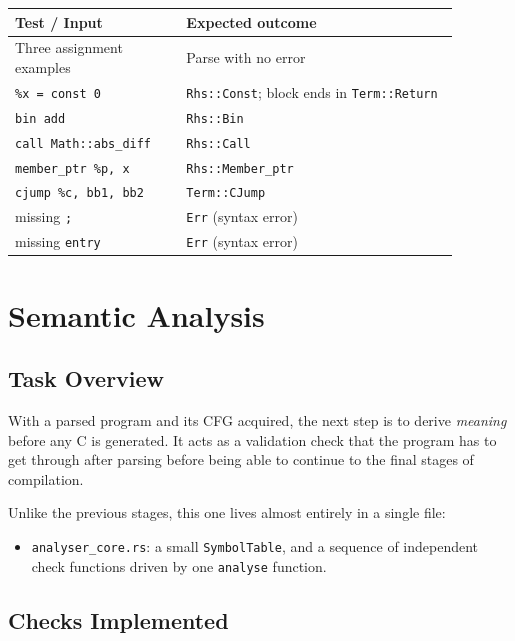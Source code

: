 \documentclass[11pt,a4paper,oneside]{report}
\begin{document}
	\begin{longtable}{p{0.34\linewidth}p{0.54\linewidth}}
		\toprule
		\textbf{Test / Input} & \textbf{Expected outcome} \\
		\midrule
		\endhead
		Three assignment examples        & Parse with no error \\
		\midrule
		\texttt{\%x = const 0}           & \texttt{Rhs::Const}; block ends in \texttt{Term::Return} \\
		\midrule
		\texttt{bin add}                 & \texttt{Rhs::Bin} \\
		\midrule
		\texttt{call Math::abs\_diff}    & \texttt{Rhs::Call} \\
		\midrule
		\texttt{member\_ptr \%p, x}      & \texttt{Rhs::Member\_ptr} \\
		\midrule
		\texttt{cjump \%c, bb1, bb2}     & \texttt{Term::CJump} \\
		\midrule
		missing \texttt{;}               & \texttt{Err} (syntax error) \\
		\midrule
		missing \texttt{entry}           & \texttt{Err} (syntax error) \\
		\bottomrule
	\end{longtable}
	
	\chapter{Semantic Analysis}
	
	\section{Task Overview}
	With a parsed program and its CFG acquired, the next step is to derive \textit{meaning} before any C is generated. It acts as a validation check that the program has to get through after parsing before being able to continue to the final stages of compilation. 
	
	Unlike the previous stages, this one lives almost entirely in a single file:
	
	\begin{itemize}
		\item \texttt{analyser\_core.rs}: a small \texttt{SymbolTable}, and a sequence of independent check functions driven by one \texttt{analyse} function.
	\end{itemize}
	
	\section{Checks Implemented}
	
\end{document}
